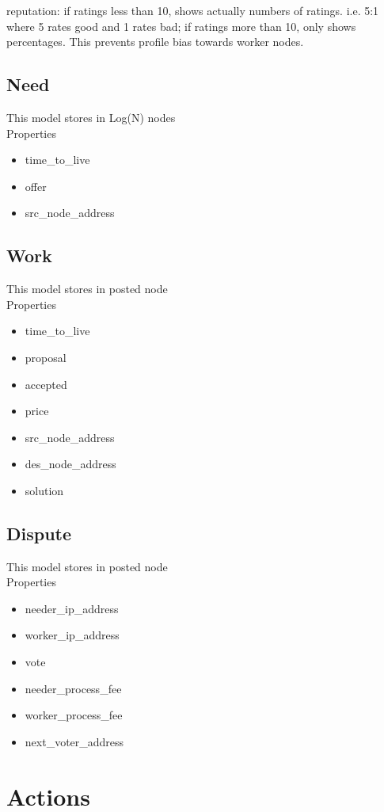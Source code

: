 \documentclass[12pt]{article}
\begin{document}
reputation:
if ratings less than 10, shows actually numbers of ratings. i.e. 5:1 where 5 rates good and 1 rates bad;
if ratings more than 10, only shows percentages. This prevents profile bias towards worker nodes.

\subsection{Need}
This model stores in Log(N) nodes\\
Properties
\begin{itemize}
	\item time\_to\_live
	\item offer
	\item src\_node\_address
\end{itemize}

\subsection{Work}
This model stores in posted node\\
Properties
\begin{itemize}
	\item time\_to\_live
	\item proposal
	\item accepted
	\item price
	\item src\_node\_address
	\item des\_node\_address
	\item solution
\end{itemize}

\subsection{Dispute}
This model stores in posted node\\
Properties
\begin{itemize}
	\item needer\_ip\_address
	\item worker\_ip\_address
	\item vote
	\item needer\_process\_fee
	\item worker\_process\_fee
	\item next\_voter\_address
\end{itemize}

\section{Actions}
\end{document}
